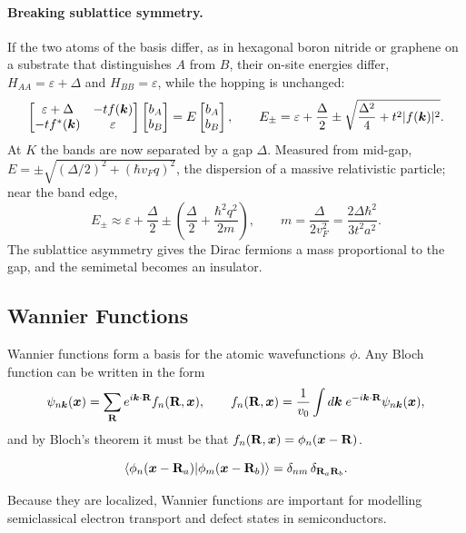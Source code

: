 \paragraph{Breaking sublattice symmetry.} If the two atoms of the basis differ, as in hexagonal boron nitride or graphene on a substrate that distinguishes $A$ from $B$, their on-site energies differ, $H_{AA}=\varepsilon+\Delta$ and $H_{BB}=\varepsilon$, while the hopping is unchanged:
\begin{equation}
    \begin{bmatrix} \varepsilon+\Delta & -tf(\bm{k}) \\ -tf^*(\bm{k}) & \varepsilon \end{bmatrix}
    \begin{bmatrix} b_A \\ b_B \end{bmatrix}
    = E \begin{bmatrix} b_A \\ b_B \end{bmatrix},
    \qquad
    E_\pm = \varepsilon + \frac{\Delta}{2} \pm \sqrt{\frac{\Delta^2}{4} + t^2|f(\bm{k})|^2}.
\end{equation}
At $K$ the bands are now separated by a gap $\Delta$. Measured from mid-gap, $E = \pm\sqrt{(\Delta/2)^2+(\hbar v_Fq)^2}$, the dispersion of a massive relativistic particle; near the band edge,
\begin{equation}
    E_\pm \approx \varepsilon+\frac{\Delta}{2} \pm\left(\frac{\Delta}{2} + \frac{\hbar^2 q^2}{2m}\right),
    \qquad
    m = \frac{\Delta}{2v_F^2} = \frac{2\Delta\hbar^2}{3t^2a^2}.
\end{equation}
The sublattice asymmetry gives the Dirac fermions a mass proportional to the gap, and the semimetal becomes an insulator.

\subsection{Wannier Functions}

Wannier functions form a basis for the atomic wavefunctions $\phi$. Any Bloch function can be written in the form
\begin{equation}
    \psi_{n\lvect{k}}(\lvect{x}) = \sum_{\cvect{R}} e^{i\lvect{k}\cdot\cvect{R}} f_n(\cvect{R}, \lvect{x}),
    \qquad
    f_n(\cvect{R},\lvect{x}) = \frac{1}{v_0} \int d\lvect{k}\; e^{-i\lvect{k}\cdot\cvect{R}} \psi_{n\lvect{k}}(\lvect{x}),
\end{equation}
and by Bloch's theorem it must be that $f_n(\cvect{R},\lvect{x}) = \phi_n(\lvect{x}-\cvect{R})$.

\begin{fact}[Orthogonality]
\begin{equation}
    \braket{\phi_n(\lvect{x}-\cvect{R}_a)}{\phi_m(\lvect{x}-\cvect{R}_b)} = \delta_{nm}\,\delta_{\cvect{R}_a\cvect{R}_b}.
\end{equation}
\end{fact}

Because they are localized, Wannier functions are important for modelling semiclassical electron transport and defect states in semiconductors.
